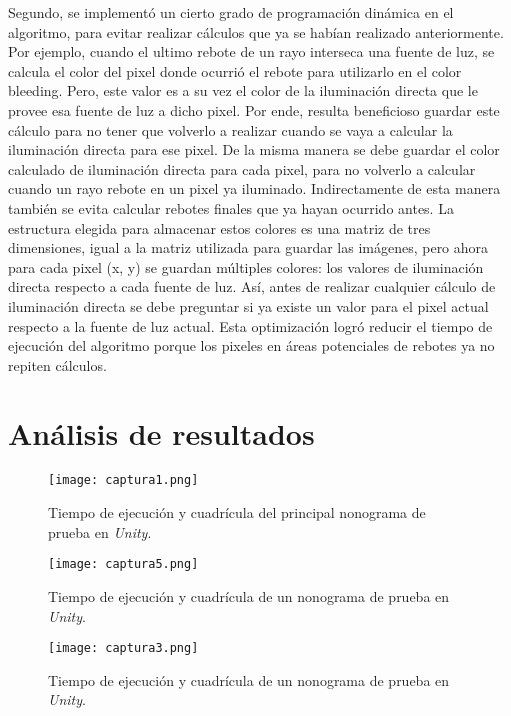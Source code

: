 \documentclass[conference]{IEEEtran}
\begin{document}
Segundo, se implementó un cierto grado de programación dinámica en el algoritmo, para evitar realizar cálculos que ya se habían realizado anteriormente. Por ejemplo, cuando el ultimo rebote de un rayo interseca una fuente de luz, se calcula el color del pixel donde ocurrió el rebote para utilizarlo en el color bleeding. Pero, este valor es a su vez el color de la iluminación directa que le provee esa fuente de luz a dicho pixel. Por ende, resulta beneficioso guardar este cálculo para no tener que volverlo a realizar cuando se vaya a calcular la iluminación directa para ese pixel. De la misma manera se debe guardar el color calculado de iluminación directa para cada pixel, para no volverlo a calcular cuando un rayo rebote en un pixel ya iluminado. Indirectamente de esta manera también se evita calcular rebotes finales que ya hayan ocurrido antes. La estructura elegida para almacenar estos colores es una matriz de tres dimensiones, igual a la matriz utilizada para guardar las imágenes, pero ahora para cada pixel (x, y) se guardan múltiples colores: los valores de iluminación directa respecto a cada fuente de luz. Así, antes de realizar cualquier cálculo de iluminación directa se debe preguntar si ya existe un valor para el pixel actual respecto a la fuente de luz actual. Esta optimización logró reducir el tiempo de ejecución del algoritmo porque los pixeles en áreas potenciales de rebotes ya no repiten cálculos.

\section{Análisis de resultados}

\begin{figure}[htbp]
\centerline{\texttt{[image: captura1.png]}}
\caption{Tiempo de ejecución y cuadrícula del principal nonograma de prueba en \textit{Unity}.}
\label{PerraLoca}
\end{figure}
\begin{figure}[htbp]
\centerline{\texttt{[image: captura5.png]}}
\caption{Tiempo de ejecución y cuadrícula de un nonograma de prueba en \textit{Unity}.}
\label{ArbolNavidad}
\end{figure}


\begin{figure}[htbp]
\centerline{\texttt{[image: captura3.png]}}
\caption{Tiempo de ejecución y cuadrícula de un nonograma de prueba en \textit{Unity}.}
\label{Aleatorio20x30}
\end{figure}
\end{document}
